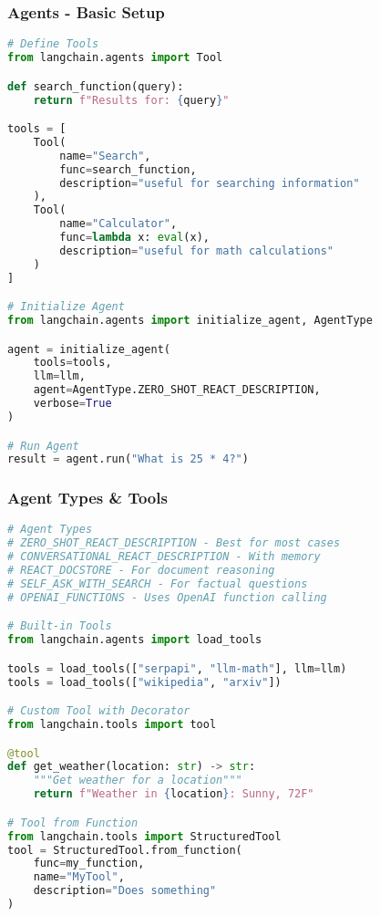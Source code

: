 \begin{frame}[fragile]\frametitle{Agents - Basic Setup}
\begin{lstlisting}[language=python,basicstyle=\tiny]
# Define Tools
from langchain.agents import Tool

def search_function(query):
    return f"Results for: {query}"

tools = [
    Tool(
        name="Search",
        func=search_function,
        description="useful for searching information"
    ),
    Tool(
        name="Calculator",
        func=lambda x: eval(x),
        description="useful for math calculations"
    )
]

# Initialize Agent
from langchain.agents import initialize_agent, AgentType

agent = initialize_agent(
    tools=tools,
    llm=llm,
    agent=AgentType.ZERO_SHOT_REACT_DESCRIPTION,
    verbose=True
)

# Run Agent
result = agent.run("What is 25 * 4?")
\end{lstlisting}
\end{frame}

\begin{frame}[fragile]\frametitle{Agent Types \& Tools}
\begin{lstlisting}[language=python,basicstyle=\tiny]
# Agent Types
# ZERO_SHOT_REACT_DESCRIPTION - Best for most cases
# CONVERSATIONAL_REACT_DESCRIPTION - With memory
# REACT_DOCSTORE - For document reasoning
# SELF_ASK_WITH_SEARCH - For factual questions
# OPENAI_FUNCTIONS - Uses OpenAI function calling

# Built-in Tools
from langchain.agents import load_tools

tools = load_tools(["serpapi", "llm-math"], llm=llm)
tools = load_tools(["wikipedia", "arxiv"])

# Custom Tool with Decorator
from langchain.tools import tool

@tool
def get_weather(location: str) -> str:
    """Get weather for a location"""
    return f"Weather in {location}: Sunny, 72F"

# Tool from Function
from langchain.tools import StructuredTool
tool = StructuredTool.from_function(
    func=my_function,
    name="MyTool",
    description="Does something"
)
\end{lstlisting}
\end{frame}

